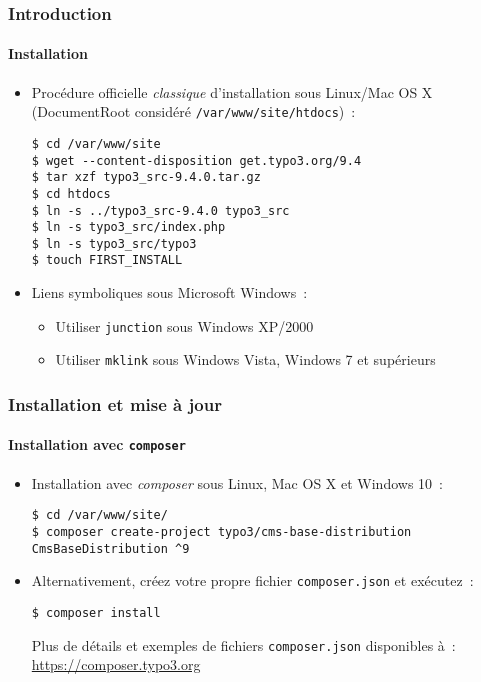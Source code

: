 \begin{frame}[fragile]
	\frametitle{Introduction}
	\framesubtitle{Installation}

	\begin{itemize}
		\item Procédure officielle \textit{classique} d'installation sous Linux/Mac OS X\newline
			(DocumentRoot considéré \texttt{/var/www/site/htdocs})~:
		\begin{lstlisting}
$ cd /var/www/site
$ wget --content-disposition get.typo3.org/9.4
$ tar xzf typo3_src-9.4.0.tar.gz
$ cd htdocs
$ ln -s ../typo3_src-9.4.0 typo3_src
$ ln -s typo3_src/index.php
$ ln -s typo3_src/typo3
$ touch FIRST_INSTALL
		\end{lstlisting}

		\item Liens symboliques sous Microsoft Windows~:

			\begin{itemize}
				\item Utiliser \texttt{junction} sous Windows XP/2000
				\item Utiliser \texttt{mklink} sous Windows Vista, Windows 7 et supérieurs
			\end{itemize}

	\end{itemize}
\end{frame}


\begin{frame}[fragile]
	\frametitle{Installation et mise à jour}
	\framesubtitle{Installation avec \texttt{composer}}

	\begin{itemize}
		\item Installation avec \textit{composer} sous Linux, Mac OS X et Windows 10~:

			\begin{lstlisting}
$ cd /var/www/site/
$ composer create-project typo3/cms-base-distribution CmsBaseDistribution ^9
			\end{lstlisting}

		\item Alternativement, créez votre propre fichier \texttt{composer.json} et exécutez~:

			\begin{lstlisting}
$ composer install
			\end{lstlisting}

			Plus de détails et exemples de fichiers \texttt{composer.json} disponibles à~:\newline
			\smaller
				\href{https://composer.typo3.org}{https://composer.typo3.org}
			\normalsize

	\end{itemize}
\end{frame}

